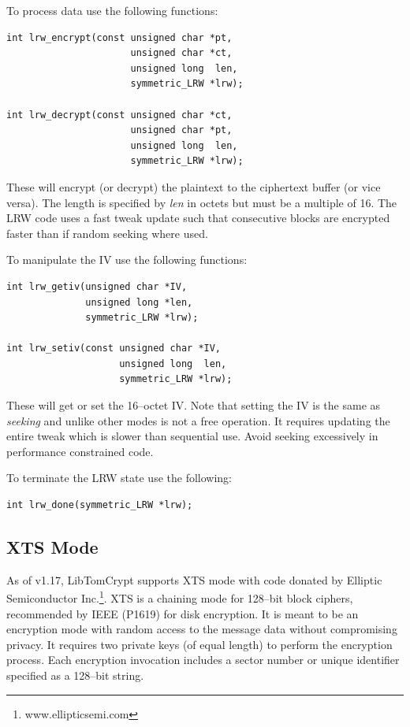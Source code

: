 \documentclass[synpaper]{book}
\begin{document}
To process data use the following functions:

 
\begin{verbatim}
int lrw_encrypt(const unsigned char *pt,
                      unsigned char *ct,
                      unsigned long  len,
                      symmetric_LRW *lrw);

int lrw_decrypt(const unsigned char *ct,
                      unsigned char *pt,
                      unsigned long  len,
                      symmetric_LRW *lrw);
\end{verbatim}

These will encrypt (or decrypt) the plaintext to the ciphertext buffer (or vice versa).  The length is specified by \textit{len} in octets but must be a multiple
of 16.  The LRW code uses a fast tweak update such that consecutive blocks are encrypted faster than if random seeking where used.

To manipulate the IV use the following functions:

 
\begin{verbatim}
int lrw_getiv(unsigned char *IV,
              unsigned long *len,
              symmetric_LRW *lrw);

int lrw_setiv(const unsigned char *IV,
                    unsigned long  len,
                    symmetric_LRW *lrw);
\end{verbatim}
These will get or set the 16--octet IV.  Note that setting the IV is the same as \textit{seeking} and unlike other modes is not a free operation.  It requires
updating the entire tweak which is slower than sequential use.  Avoid seeking excessively in performance constrained code.

To terminate the LRW state use the following:

\begin{verbatim}
int lrw_done(symmetric_LRW *lrw);
\end{verbatim}

\subsection{XTS Mode}
As of v1.17, LibTomCrypt supports XTS mode with code donated by Elliptic Semiconductor Inc.\footnote{www.ellipticsemi.com}.
XTS is a chaining mode for 128--bit block ciphers, recommended by IEEE (P1619)
for disk encryption.  It is meant to be an encryption mode with random access to the message data without compromising privacy.  It requires two private keys (of equal
length) to perform the encryption process.  Each encryption invocation includes a sector number or unique identifier specified as a 128--bit string.
\end{document}
